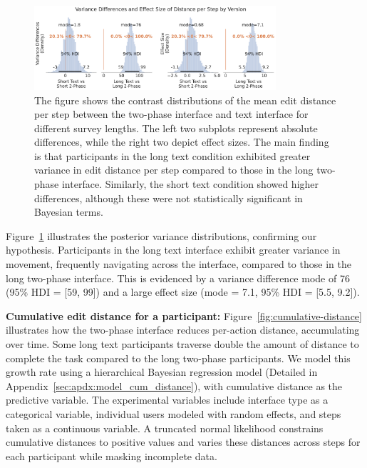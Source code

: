\begin{figure}[h]
    \centering
    \includegraphics[width=0.8\textwidth]{content/image/distance/distance_diff_per_step_effect_size_by_version.pdf}
    \caption{The figure shows the contrast distributions of the mean edit distance per step between the two-phase interface and text interface for different survey lengths. The left two subplots represent absolute differences, while the right two depict effect sizes. The main finding is that participants in the long text condition exhibited greater variance in edit distance per step compared to those in the long two-phase interface. Similarly, the short text condition showed higher differences, although these were not statistically significant in Bayesian terms.}
    \label{fig:step-over-distance_bayesian}
\end{figure}

Figure~\ref{fig:step-over-distance_bayesian} illustrates the posterior variance distributions, confirming our hypothesis. Participants in the long text interface exhibit greater variance in movement, frequently navigating across the interface, compared to those in the long two-phase interface. This is evidenced by a variance difference mode of 76 (95\% HDI = [59, 99]) and a large effect size (mode = 7.1, 95\% HDI = [5.5, 9.2]).

\textbf{Cumulative edit distance for a participant:} Figure~\ref{fig:cumulative-distance} illustrates how the two-phase interface reduces per-action distance, accumulating over time. Some long text participants traverse double the amount of distance to complete the task compared to the long two-phase participants. We model this growth rate using a hierarchical Bayesian regression model (Detailed in Appendix~\ref{sec:apdx:model_cum_distance}), with cumulative distance as the predictive variable. The experimental variables include interface type as a categorical variable, individual users modeled with random effects, and steps taken as a continuous variable. A truncated normal likelihood constrains cumulative distances to positive values and varies these distances across steps for each participant while masking incomplete data.

